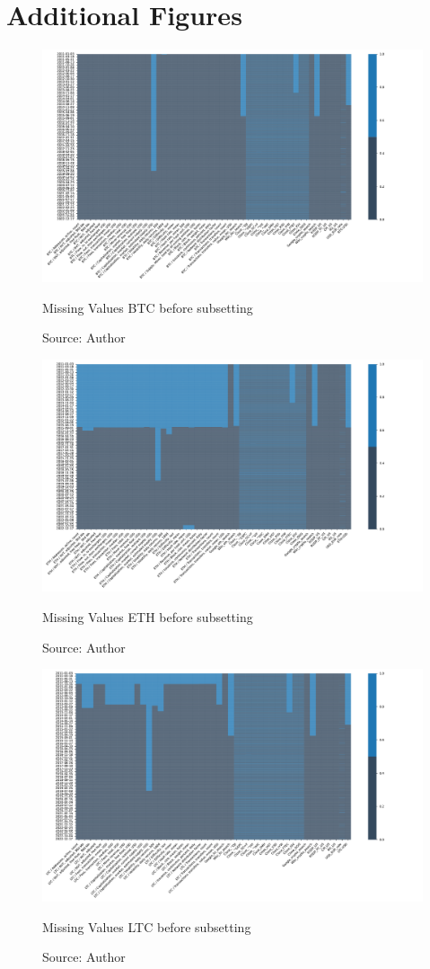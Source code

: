 \chapter{Additional Figures}

\begin{figure}[!htbp]
    \centering
    \includegraphics[width=1.1\linewidth,height=0.9\textheight,keepaspectratio]{Figures/BTC_missing_1.pdf}
    \caption{Missing Values BTC before subsetting}
    \label{fig:btc_missing_1}
    \caption*{Source: Author}
\end{figure}

\begin{figure}[!htbp]
    \centering
    \includegraphics[width=1.1\linewidth,height=0.9\textheight,keepaspectratio]{Figures/ETH_missing_1.pdf}
    \caption{Missing Values ETH before subsetting}
    \label{fig:eth_missing_1}
    \caption*{Source: Author}
\end{figure}

\begin{figure}[!htbp]
    \centering
    \includegraphics[width=1.1\linewidth,height=0.9\textheight,keepaspectratio]{Figures/LTC_missing_1.pdf}
    \caption{Missing Values LTC before subsetting}
    \label{fig:ltc_missing_1}
    \caption*{Source: Author}
\end{figure}